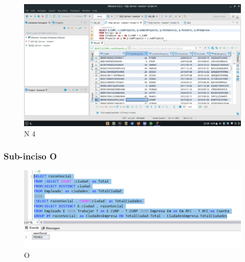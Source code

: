 \documentclass[a4paper, 12pt]{report}
\begin{document}
    \begin{figure}
        \includegraphics[width=\textwidth]
            {img/n4.jpeg}\hfill
    \caption{N 4}
    \end{figure}

\subsubsection*{Sub-inciso O}
    \begin{figure}
        \includegraphics[width=\textwidth]
            {img/O.png}\hfill
    \caption{O}
    \end{figure}
\end{document}

